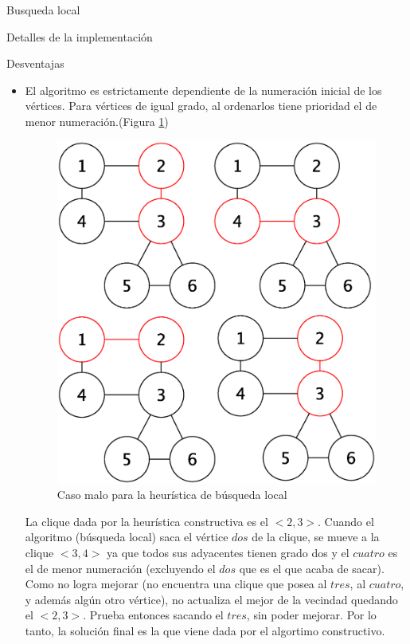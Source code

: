 \begin{section}{Busqueda local}
\begin{subsection}{Detalles de la implementación}
\begin{itemize}
		\end{itemize}
		\end{subsection}
		\begin{subsection}{Desventajas}
			\begin{itemize}	
				\item El algoritmo es estrictamente dependiente de la numeración inicial de los vértices. Para vértices de igual grado, al ordenarlos tiene prioridad el de menor numeración.(Figura \ref{fig:seguimiento_caso_malo_busqueda_local})

				\begin{figure}[H]
					\centering
			    	\includegraphics[scale=0.5]{busqueda_local/segCasoMalo.eps}
				    \caption{Caso malo para la heurística de búsqueda local}
				    \label{fig:seguimiento_caso_malo_busqueda_local}
				\end{figure}


				La clique dada por la heurística constructiva es el $<2,3>$.
				Cuando el algoritmo (búsqueda local) saca el vértice $dos$ de la clique, se mueve a la clique $<3,4>$ ya que todos sus adyacentes tienen grado dos y el $cuatro$ es el de menor numeración (excluyendo el $dos$ que es el que acaba de sacar). Como no logra mejorar (no encuentra una clique que posea al $tres$, al $cuatro$, y además algún otro vértice), no actualiza el mejor de la vecindad quedando el $<2,3>$. Prueba entonces sacando el $tres$, sin poder mejorar. Por lo tanto, la solución final es la que viene dada por el algortimo constructivo.
	


\end{itemize}
\end{subsection}
\end{section}

